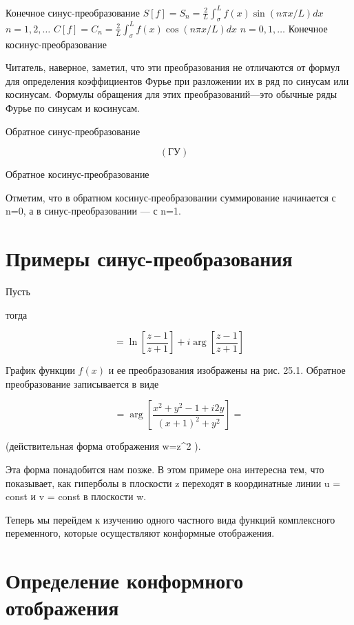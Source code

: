 \documentclass[
  ukrainian,
]{article}
\begin{document}
Конечное синус-преобразование
\(S[f] = S_n = \frac{2}{L} \int_{\sigma}^{L} f(x) \sin(n\pi x/L) dx\)
\(n = 1, 2, \dots\)
\(C[f] = C_n = \frac{2}{L} \int_{\sigma}^{L} f(x) \cos(n\pi x/L) dx\)
\(n = 0, 1, \dots\) Конечное косинус-преобразование

Читатель, наверное, заметил, что эти преобразования не отличаются от
формул для определения коэффициентов Фурье при разложении их в ряд по
синусам или косинусам. Формулы обращения для этих преобразований---это
обычные ряды Фурье по синусам и косинусам.

Обратное синус-преобразование

\[
(\text{ГУ}) \quad
\]

Обратное косинус-преобразование

Отметим, что в обратном косинус-преобразовании суммирование начинается с
n=0, а в синус-преобразовании --- с n=1.

\section{Примеры
синус-преобразования}\label{ux43fux440ux438ux43cux435ux440ux44b-ux441ux438ux43dux443ux441-ux43fux440ux435ux43eux431ux440ux430ux437ux43eux432ux430ux43dux438ux44f}

Пусть

тогда

\[
= \ln\left[\frac{z-1}{z+1}\right] + i \arg\left[\frac{z-1}{z+1}\right]
\]

График функции \(f(x)\) и ее преобразования изображены на рис. 25.1.
Обратное преобразование записывается в виде

\[
= \arg\left[\frac{x^2+y^2-1+i2y}{(x+1)^2+y^2}\right] =
\]

(действительная форма отображения w=z\^{}2 ).

Эта форма понадобится нам позже. В этом примере она интересна тем, что
показывает, как гиперболы в плоскости z переходят в координатные линии u
= const и v = const в плоскости w.

Теперь мы перейдем к изучению одного частного вида функций комплексного
переменного, которые осуществляют конформные отображения.

\section{Определение конформного
отображения}\label{ux43eux43fux440ux435ux434ux435ux43bux435ux43dux438ux435-ux43aux43eux43dux444ux43eux440ux43cux43dux43eux433ux43e-ux43eux442ux43eux431ux440ux430ux436ux435ux43dux438ux44f}
\end{document}

